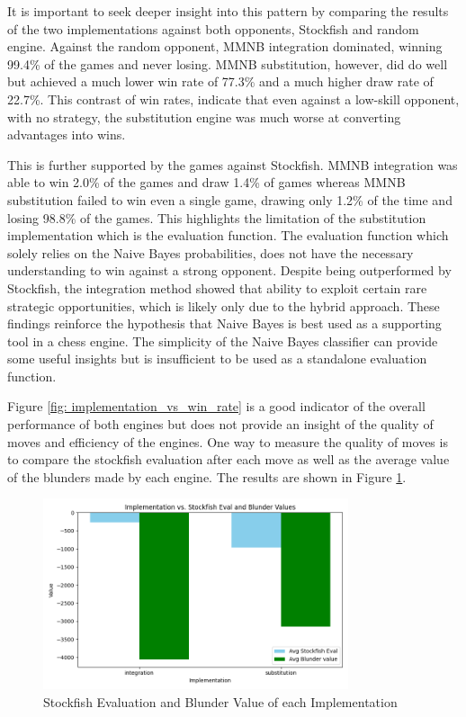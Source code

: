 It is important to seek deeper insight into this pattern by comparing the results of the two implementations against both opponents, Stockfish and random engine. Against the random opponent, MMNB integration dominated, winning 99.4\% of the games and never losing. MMNB substitution, however, did do well but achieved a much lower win rate of 77.3\% and a much higher draw rate of 22.7\%. This contrast of win rates, indicate that even against a low-skill opponent, with no strategy, the substitution engine was much worse at converting advantages into wins.

This is further supported by the games against Stockfish. MMNB integration was able to win 2.0\% of the games and draw 1.4\% of games whereas MMNB substitution failed to win even a single game, drawing only 1.2\% of the time and losing 98.8\% of the games. This highlights the limitation of the substitution implementation which is the evaluation function. The evaluation function which solely relies on the Naive Bayes probabilities, does not have the necessary understanding to win against a strong opponent. Despite being outperformed by Stockfish, the integration method showed that ability to exploit certain rare strategic opportunities, which is likely only due to the hybrid approach. These findings reinforce the hypothesis that Naive Bayes is best used as a supporting tool in a chess engine. The simplicity of the Naive Bayes classifier can provide some useful insights but is insufficient to be used as a standalone evaluation function.

Figure \ref{fig: implementation_vs_win_rate} is a good indicator of the overall performance of both engines but does not provide an insight of the quality of moves and efficiency of the engines. One way to measure the quality of moves is to compare the stockfish evaluation after each move as well as the average value of the blunders made by each engine. The results are shown in Figure \ref{fig: implementation_vs_stockfish_eval_and_blunder_value}.

\begin{figure}[H]
    \centering
    \includegraphics[width=0.8\textwidth]{images/plots/implementation/Implementation_vs_stockfish_eval_and_blunder_value.png}
    \caption{Stockfish Evaluation and Blunder Value of each Implementation}
    \label{fig: implementation_vs_stockfish_eval_and_blunder_value}
\end{figure}

